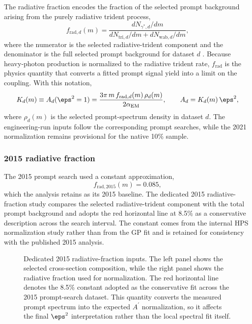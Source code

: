 The radiative fraction encodes the fraction of the selected prompt background arising
from the purely radiative trident process,
\begin{equation}
f_{\mathrm{rad},d}(m)
=
\frac{dN_{\gamma^\ast,d}/dm}{dN_{\mathrm{tri},d}/dm + dN_{\mathrm{wab},d}/dm},
\label{eq:frad-def}
\end{equation}
where the numerator is the selected radiative-trident component and the denominator is
the full selected prompt background for dataset $d$
\cite{HPS2015DarkPhoton,HPS2016PromptLong}. Because heavy-photon production is
normalized to the radiative trident rate, $f_{\mathrm{rad}}$ is the physics quantity
that converts a fitted prompt signal yield into a limit on the coupling. With this
notation,
\begin{equation}
K_d(m) \equiv A_d(\eps^2 = 1)
= \frac{3\pi\,m\,f_{\mathrm{rad},d}(m)\,\rho_d(m)}{2\alpha_{\mathrm{EM}}},
\qquad
A_d = K_d(m)\,\eps^2,
\label{eq:kd-radfrac}
\end{equation}
where $\rho_d(m)$ is the selected prompt-spectrum density in dataset $d$. The
engineering-run inputs follow the corresponding prompt searches, while the 2021
normalization remains provisional for the native 10\% sample.

\subsubsection{2015 radiative fraction}

The 2015 prompt search used a constant approximation,
\begin{equation}
f_{\mathrm{rad},2015}(m) = 0.085,
\end{equation}
which the analysis retains as its 2015 baseline. The dedicated 2015
radiative-fraction study compares the selected radiative-trident component with the
total prompt background and adopts the red horizontal line at 8.5\% as a conservative
description across the search interval. The constant comes from the internal HPS
normalization study rather than from the GP fit and is retained for consistency with
the published 2015 analysis.

\begin{figure}[H]
\centering
{}
\caption{Dedicated 2015 radiative-fraction inputs. The left panel shows the selected
cross-section composition, while the right panel shows the radiative fraction used for
normalization. The red horizontal line denotes the 8.5\% constant adopted as the
conservative fit across the 2015 prompt-search dataset. This quantity converts the
measured prompt spectrum into the expected $A^\prime$ normalization, so it affects the
final $\eps^2$ interpretation rather than the local spectral fit itself.}
\label{fig:2015-radfrac}
\end{figure}


